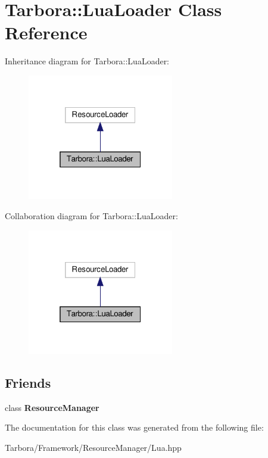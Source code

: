 \hypertarget{classTarbora_1_1LuaLoader}{}\section{Tarbora\+:\+:Lua\+Loader Class Reference}
\label{classTarbora_1_1LuaLoader}


Inheritance diagram for Tarbora\+:\+:Lua\+Loader\+:
\nopagebreak
\begin{figure}[H]
\begin{center}
\leavevmode
\includegraphics[width=181pt]{classTarbora_1_1LuaLoader__inherit__graph}
\end{center}
\end{figure}


Collaboration diagram for Tarbora\+:\+:Lua\+Loader\+:
\nopagebreak
\begin{figure}[H]
\begin{center}
\leavevmode
\includegraphics[width=181pt]{classTarbora_1_1LuaLoader__coll__graph}
\end{center}
\end{figure}
\subsection*{Friends}
\begin{DoxyCompactItemize}
\item 
\mbox{\label{classTarbora_1_1LuaLoader_a54c1252abc87a78a301e6b6984470408}} 
class {\bfseries Resource\+Manager}
\end{DoxyCompactItemize}


The documentation for this class was generated from the following file\+:\begin{DoxyCompactItemize}
\item 
Tarbora/\+Framework/\+Resource\+Manager/Lua.\+hpp\end{DoxyCompactItemize}
